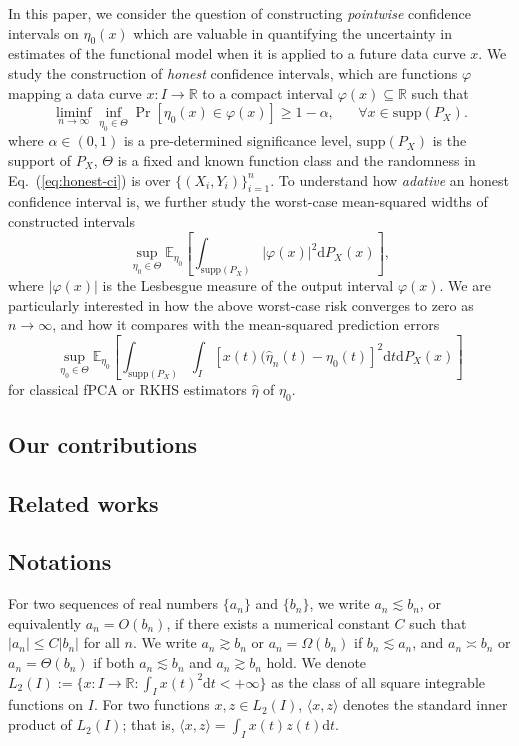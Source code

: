 \documentclass[11pt,a4paper]{article}
\renewcommand{\hat}{\widehat}
\theoremstyle{definition}
\theoremstyle{plain}
\theoremstyle{remark}
\newcommand{\supp}{\mathrm{supp}}
\newcommand{\ud}{\mathrm d}
\begin{document}
In this paper, we consider the question of constructing \emph{pointwise} confidence intervals on $\eta_0(x)$ which are valuable in quantifying the uncertainty in estimates of the functional model
when it is applied to a future data curve $x$. We study the construction of \emph{honest} confidence intervals, which are functions $\varphi$ mapping a data curve $x:I\to\mathbb R$ to a compact interval $\varphi(x)\subseteq\mathbb R$
such that
\begin{equation}
\liminf_{n\to\infty}\inf_{\eta_0\in\Theta} \Pr\left[\eta_0(x)\in\varphi(x)\right] \geq 1-\alpha,\;\;\;\;\;\;\forall x\in\mathrm{supp}(P_X).
\label{eq:honest-ci}
\end{equation}
where $\alpha\in(0,1)$ is a pre-determined significance level,
$\supp(P_X)$ is the support of $P_X$, $\Theta$ is a fixed and known function class and the randomness in Eq.~(\ref{eq:honest-ci}) is over $\{(X_i,Y_i)\}_{i=1}^n$.
To understand how \emph{adative} an honest confidence interval is, we further study the worst-case mean-squared widths of constructed intervals
\begin{equation}
\sup_{\eta_0\in\Theta}\mathbb E_{\eta_0} \left[\int_{\supp(P_X)}\big|\varphi(x)\big|^2\ud P_X(x)\right],
\label{eq:adaptive}
\end{equation}
where $|\varphi(x)|$ is the Lesbesgue measure of the output interval $\varphi(x)$. We are particularly interested in how the above worst-case risk converges to zero as $n\to\infty$,
and how it compares with the mean-squared prediction errors
$$
\sup_{\eta_0\in\Theta}\mathbb E_{\eta_0} \left[\int_{\supp(P_X)}\int_I [x(t)(\hat\eta_n(t)-\eta_0(t)]^2\ud t\ud P_X(x)\right]
$$
for classical fPCA or RKHS estimators $\hat\eta$ of $\eta_0$.

\subsection{Our contributions}

\subsection{Related works}

\subsection{Notations}

For two sequences of real numbers $\{a_n\}$ and $\{b_n\}$, we write $a_n\lesssim b_n$, or equivalently $a_n=O(b_n)$, if there exists a numerical constant $C$ such that $|a_n|\leq C|b_n|$ for all $n$.
We write $a_n\gtrsim b_n$ or $a_n=\Omega(b_n)$ if $b_n\lesssim a_n$, and $a_n\asymp b_n$ or $a_n=\Theta(b_n)$ if both $a_n\lesssim b_n$ and $a_n\gtrsim b_n$ hold.
We denote $L_2(I):=\{x: I\to\mathbb R: \int_I x(t)^2\ud t<+\infty\}$ as the class of all square integrable functions on $I$.
For two functions $x,z\in L_2(I)$, $\langle x,z\rangle$ denotes the standard inner product of $L_2(I)$; that is, $\langle x,z\rangle = \int_I x(t)z(t)\ud t$.
\end{document}
